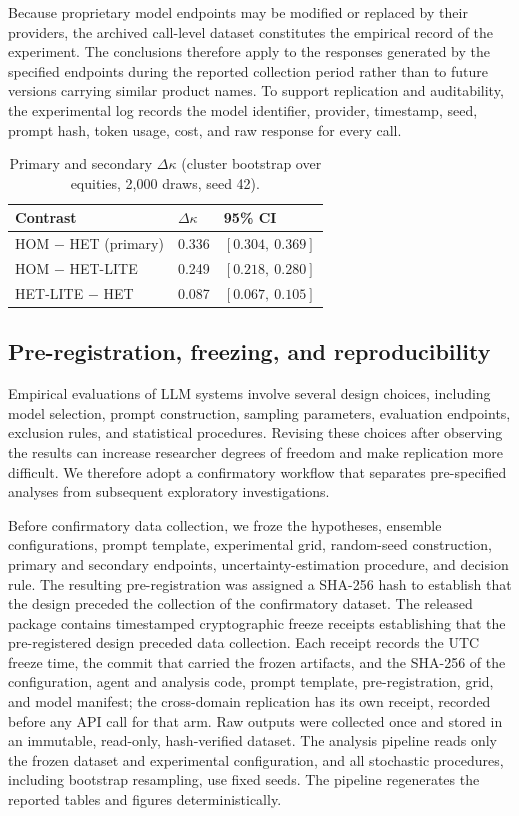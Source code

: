 \documentclass{ieeeaccess}
\begin{document}
Because proprietary model endpoints may be modified or replaced by their
providers, the archived call-level dataset constitutes the empirical record of
the experiment. The conclusions therefore apply to the responses generated by
the specified endpoints during the reported collection period rather than to
future versions carrying similar product names. To support replication and
auditability, the experimental log records the model identifier, provider,
timestamp, seed, prompt hash, token usage, cost, and raw response for every
call.

\begin{table}[!t]
\centering
\caption{Primary and secondary $\Delta\kappa$ (cluster bootstrap over equities,
2{,}000 draws, seed 42).}
\label{tab:endpoints}
\begin{tabular}{lll}
\toprule
Contrast & $\Delta\kappa$ & 95\% CI \\
\midrule
HOM $-$ HET (primary) & 0.336 & $[0.304,\ 0.369]$ \\
HOM $-$ HET-LITE & 0.249 & $[0.218,\ 0.280]$ \\
HET-LITE $-$ HET & 0.087 & $[0.067,\ 0.105]$ \\
\bottomrule
\end{tabular}
\end{table}

\subsection{Pre-registration, freezing, and reproducibility}
\label{sec:prereg}
Empirical evaluations of LLM systems involve several design choices, including
model selection, prompt construction, sampling parameters, evaluation endpoints,
exclusion rules, and statistical procedures. Revising these choices after
observing the results can increase researcher degrees of freedom and make
replication more difficult. We therefore adopt a confirmatory workflow that
separates pre-specified analyses from subsequent exploratory investigations.

Before confirmatory data collection, we froze the hypotheses, ensemble
configurations, prompt template, experimental grid, random-seed construction,
primary and secondary endpoints, uncertainty-estimation procedure, and decision
rule. The resulting pre-registration was assigned a SHA-256 hash to establish
that the design preceded the collection of the confirmatory dataset. The released
package contains timestamped cryptographic freeze receipts establishing that the
pre-registered design preceded data collection. Each receipt records the UTC
freeze time, the commit that carried the frozen artifacts, and the SHA-256 of the
configuration, agent and analysis code, prompt template, pre-registration, grid,
and model manifest; the cross-domain replication has its own receipt, recorded
before any API call for that arm. Raw outputs
were collected once and stored in an immutable, read-only, hash-verified
dataset. The analysis pipeline reads only the frozen dataset and experimental
configuration, and all stochastic procedures, including bootstrap resampling,
use fixed seeds. The pipeline regenerates the reported tables and figures
deterministically.
\end{document}
